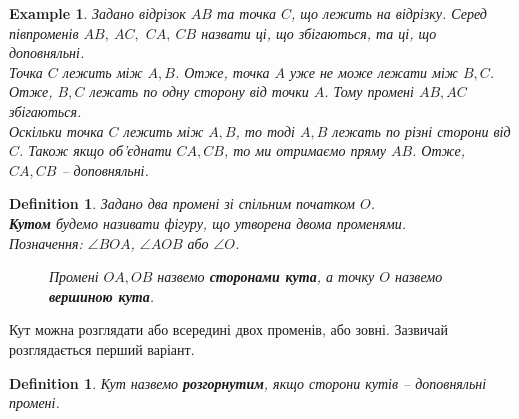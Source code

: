 \documentclass[a4paper, 10pt]{article}
\theoremstyle{theoremdd}
\theoremstyle{theoremdd}
\theoremstyle{theoremdd}
\newtheorem{definition}[theorem]{Definition}
\theoremstyle{theoremdd}
\theoremstyle{theoremdd}
\newtheorem{example}[theorem]{Example}
\theoremstyle{theoremdd}
\theoremstyle{theoremdd}
\theoremstyle{theoremdd}
\theoremstyle{theoremdd}
\begin{document}
\begin{example}
Задано відрізок $AB$ та точка $C$, що лежить на відрізку. Серед півпроменів $AB,\ AC,$ $CA,\ CB$ назвати ці, що збігаються, та ці, що доповняльні.\\
Точка $C$ лежить між $A,B$. Отже, точка $A$ уже не може лежати між $B,C$. Отже, $B,C$ лежать по одну сторону від точки $A$. Тому промені $AB,AC$ збігаються.\\
Оскільки точка $C$ лежить між $A,B$, то тоді $A,B$ лежать по різні сторони від $C$. Також якщо об'єднати $CA,CB$, то ми отримаємо пряму $AB$. Отже, $CA,CB$ -- доповняльні.
\end{example}

\begin{definition}
Задано два промені зі спільним початком $O$.\\
\textbf{Кутом} будемо називати фігуру, що утворена двома променями.\\
Позначення: $\angle BOA$, $\angle AOB$ або $\angle O$.
\begin{figure}[H]
\centering
{}
\caption*{Промені $OA,OB$ назвемо \textbf{сторонами кута}, а точку $O$ назвемо \textbf{вершиною кута}.}
\end{figure}
\end{definition}
Кут можна розглядати або всередині двох променів, або зовні. Зазвичай розглядається перший варіант.

\begin{definition}
Кут назвемо \textbf{розгорнутим}, якщо сторони кутів -- доповняльні промені.
\begin{figure}[H]
\centering
{}
\end{figure}
\end{definition}
\end{document}

